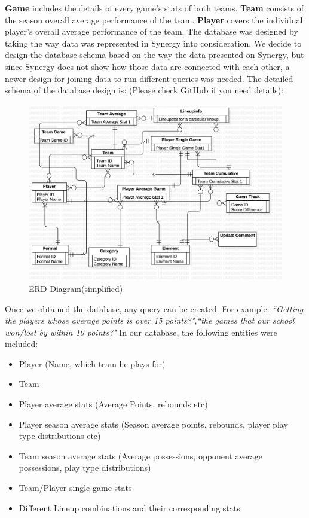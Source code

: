 \documentclass[conference]{IEEEtran}
\begin{document}
{\bf Game} includes the details of every game’s stats of both teams. {\bf Team} consists of the season overall average performance of the team. {\bf Player} covers the individual player’s overall average performance of the team. 
The database was designed by taking the way data was represented in Synergy into consideration.
We decide to design the database schema based on the way the data presented on Synergy, but since Synergy does not show how those data are connected with each other, a newer design for joining data to run different queries was needed. 
The detailed schema of the database design is: 
(Please check GitHub if you need details): 
\begin{figure}
  \includegraphics[width=\linewidth]{ERDDiagram1.jpg}
  \caption{ERD Diagram(simplified)}
  \vspace{-1mm}
  \label{fig:ERD}
\end{figure}

Once we obtained the database, any query can be created. For example: \textit{``Getting the players whose average points is over 15 points?"},\textit{``the games that our school won/lost by within 10 points?"} In our database, the following entities were included: 
\begin{itemize}
\item Player (Name, which team he plays for)
\item Team 
\item Player average stats (Average Points, rebounds etc)
\item Player season average stats (Season average points, rebounds, player play type 
distributions etc)
\item Team season average stats (Average possessions, opponent average possessions, play
type distributions) 
\item Team/Player single game stats
\item Different Lineup combinations and their corresponding stats
\end{itemize}
\end{document}
